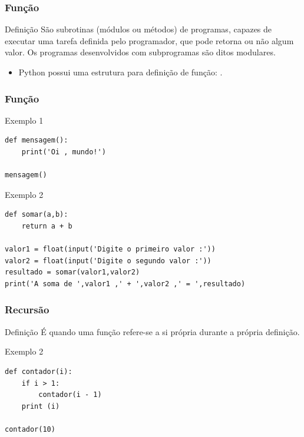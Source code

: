 \documentclass[aspectratio=169]{beamer} %
\begin{document}
\begin{frame}
\frametitle{Função}

\begin{block}{Definição}
São subrotinas (módulos ou métodos) de programas, capazes de executar uma tarefa definida pelo programador, que pode retorna ou não algum valor. Os programas desenvolvidos com subprogramas são ditos modulares.
\end{block} \vfill

\begin{itemize}
	\item Python possui uma estrutura para definição de função: .
\end{itemize}
\end{frame}

\begin{frame}[fragile]
\frametitle{Função}

\begin{exampleblock}{Exemplo 1}
	\begin{lstlisting}
def mensagem():
    print('Oi , mundo!')

mensagem()
	\end{lstlisting}
\end{exampleblock}\vfill

\begin{exampleblock}{Exemplo 2}
	\begin{lstlisting}
def somar(a,b):
    return a + b

valor1 = float(input('Digite o primeiro valor :'))
valor2 = float(input('Digite o segundo valor :'))
resultado = somar(valor1,valor2)
print('A soma de ',valor1 ,' + ',valor2 ,' = ',resultado)
	\end{lstlisting}
\end{exampleblock}
\end{frame}

\begin{frame}[fragile]
\frametitle{Recursão}

\begin{block}{Definição}
É quando uma função refere-se a si própria durante a própria definição.
\end{block} \vfill

\begin{exampleblock}{Exemplo 2}
\begin{lstlisting}
def contador(i):
    if i > 1:
        contador(i - 1)
    print (i)

contador(10)
\end{lstlisting}
\end{exampleblock}
\end{frame}
\end{document}
